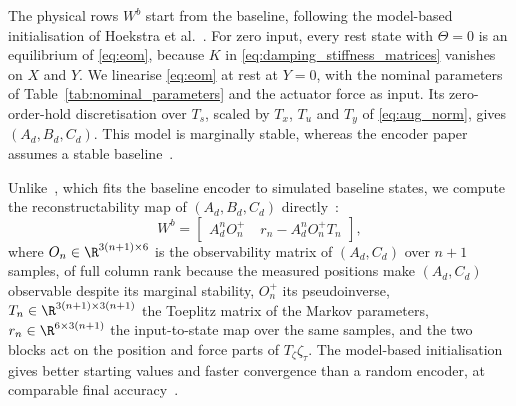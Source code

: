 The physical rows $W^b$ start from the baseline, following the model-based
initialisation of Hoekstra et al.~\cite[Sec.~3.1]{hoekstra2026encoder}.
For zero input, every rest state with $\Theta=0$ is an equilibrium of
\eqref{eq:eom}, because $K$ in \eqref{eq:damping_stiffness_matrices} vanishes on
$X$ and $Y$.
We linearise \eqref{eq:eom} at rest at $Y=0$, with the nominal parameters of
Table~\ref{tab:nominal_parameters} and the actuator force as input.
Its zero-order-hold discretisation over $T_s$, scaled by $T_x$, $T_u$ and $T_y$
of \eqref{eq:aug_norm}, gives $(A_d,B_d,C_d)$.
This model is marginally stable, whereas the encoder paper assumes a stable
baseline~\cite[Sec.~2]{hoekstra2026encoder}.

Unlike~\cite[Eq.~(30)]{hoekstra2026lfr}, which fits the baseline encoder to
simulated baseline states, we compute the reconstructability map of
$(A_d,B_d,C_d)$ directly~\cite[Eqs.~(15) to~(17)]{hoekstra2026encoder}:
\begin{equation}
 W^b=\begin{bmatrix}
  A_d^nO_n^{+} & \;r_n-A_d^nO_n^{+}T_n
 \end{bmatrix},
 \label{eq:aug_wb}
\end{equation}
where $O_n\in\R^{3(n+1)\times6}$ is the observability matrix of $(A_d,C_d)$
over $n+1$ samples, of full column rank because the measured positions make
$(A_d,C_d)$ observable despite its marginal stability, $O_n^{+}$ its
pseudoinverse, $T_n\in\R^{3(n+1)\times3(n+1)}$ the Toeplitz matrix of the
Markov parameters, $r_n\in\R^{6\times3(n+1)}$ the input-to-state map over the
same samples, and the two blocks act on the position and force parts of
$T_\zeta\zeta_\tau$.
The model-based initialisation gives better starting values and faster
convergence than a random encoder, at comparable final
accuracy~\cite[Sec.~4.4]{hoekstra2026encoder}.


